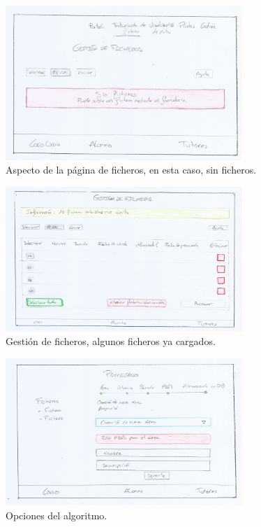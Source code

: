 \begin{figure}[!htbp]
  \centering
    \includegraphics[width=0.8\textwidth]{../img/prototipado/alta/sinficheros.png}
  \caption{Aspecto de la página de ficheros, en esta caso, sin ficheros.}
  \label{sinficheros}
\end{figure}

\begin{figure}[!htbp]
  \centering
    \includegraphics[width=0.8\textwidth]{../img/prototipado/alta/gestionficheros.png}
  \caption{Gestión de ficheros, algunos ficheros ya cargados.}
  \label{gestionficheros}
\end{figure}

\begin{figure}[!htbp]
  \centering
    \includegraphics[width=0.8\textwidth]{../img/prototipado/alta/algoritmo.png}
  \caption{Opciones del algoritmo.}
  \label{algoritmo}
\end{figure}

